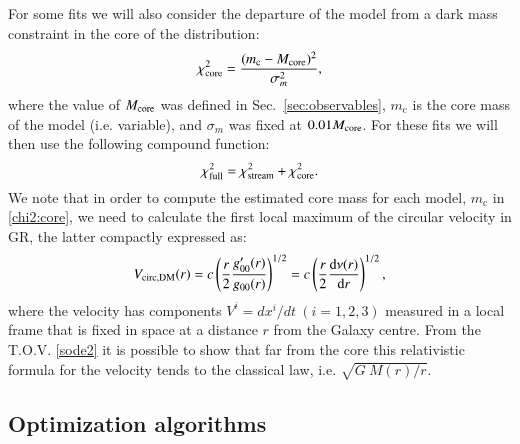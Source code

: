 \documentclass[twocolumn]{aa}
\begin{document}
For some fits we will also consider the departure of the model from a dark mass constraint in the core
of the distribution:
\begin{equation}
   \label{chi2:core}
\chi^2_{\rm{core}}=\frac{(m_\mathrm{c}-M_{\rm{core}})^2}{\sigma_m^2},
\end{equation}
where the value of $M_{\rm{core}}$ was defined in Sec.~\ref{sec:observables}, $m_\mathrm{c}$ is the core mass of the model (i.e. variable), and
$\sigma_m$ was fixed at $0.01 M_{\rm{core}}$.
For these fits we will then use the following compound function:
\begin{equation}
   \label{chi2:full}
\chi^2_{\rm{full}}=\chi^2_{\rm{stream}}+\chi^2_{\rm{core}}.
\end{equation}
We note that in order to compute the estimated core mass for each model, $m_\mathrm{c}$ in \cref{chi2:core}, we need to calculate the first local maximum of the circular velocity in GR, the latter compactly expressed as: 
\begin{equation}
   \label{v_circ_dm}
   V_{\rm{circ, DM}}(r)= c\left(\frac{r}{2}\frac{g_{00}'(r)}{g_{00}(r)}\right)^{1/2} =
                        c\left(\frac{r}{2}\frac{\mathrm{d}\nu(r)}{\mathrm{d}r}\right)^{1/2},
\end{equation}
where the velocity has components $V^i=dx^i/dt~(i=1,2,3)$ measured in a local frame that is fixed in space at a distance $r$ from the Galaxy centre. From the T.O.V. \cref{sode2} it is possible to show that far from the core this relativistic formula for the velocity tends to the classical law, i.e. $\sqrt{G~M(r)/r}$.

\subsection{Optimization algorithms}
\label{sec:optimization}
\end{document}

